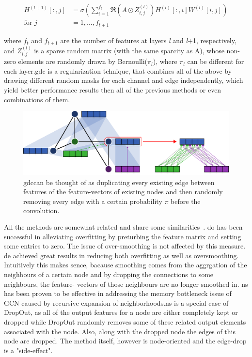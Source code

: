 \begin{align*}
    H^{(l+1)}[:,j] & = \sigma \left(\sum_{i=1}^{f_{t}}\mathfrak{R}\left(A \odot Z_{i,j}^{(l)}\right)H^{(l)}[:,i]W^{(l)}[i,j]\right) \\
    \text{for } j  & = 1,..., f_{t+1}
\end{align*}

where $f_{t}$ and $f_{t+1}$ are the number of features at layers \textit{l} and \textit{l}+1, respectively, and
$Z_{i,j}^{(l)}$ is a sparse random matrix (with the same sparcity as A), whose non-zero
elements are randomly drawn by Bernoulli($\pi_{l}$), where $\pi_{l}$ can be different for each layer.\ac{gdc} is a regularization tchnique, that combines all of the above by drawing different random masks for each channel and edge independently, which yield better performance results then all of the previous methods or even combinations of them.
\begin{figure}[H]
    \centering
    \includegraphics[width= 0.90\linewidth]{gfx/related-work/GDC}
    \caption{\acf{gdc}can be thought of as duplicating every existing edge between features of the feature-vectors of existing nodes and then randomly removing every edge with a certain probability $\pi$ before the convolution.}\label{fig:related:GraphDropConnect}
\end{figure}



All the methods are somewhat related and share some similarities~\cite{Rong2020}.
\acf{do} has been successful in alleviating overfitting by preturbing the feature matrix and setting some entries to zero. The issue of over-smoothing is not affected by this measure.
\acf{de} achieved great results in reducing both overfitting as well as oversmoothing. Intuitively this makes sence, bacause smoothing comes from the aggrgation of the neighbours of a certain node and by dropping the connections to some neighbours, the feature- vectors of those neighbours are no longer smoothed in.
\ac{ns} has been proven to be effective in addressing the memory bottleneck issue of GCN caused by recursive expansion of neighborhoods.\ac{ns} is a special case of DropOut, as all of the output features for a node are either completely kept or dropped while DropOut randomly removes some of these related output elements associated with the node. Also, along with the dropped node the edges of this node are dropped. The method itself, however is node-oriented and the edge-drop is a "side-effect".


